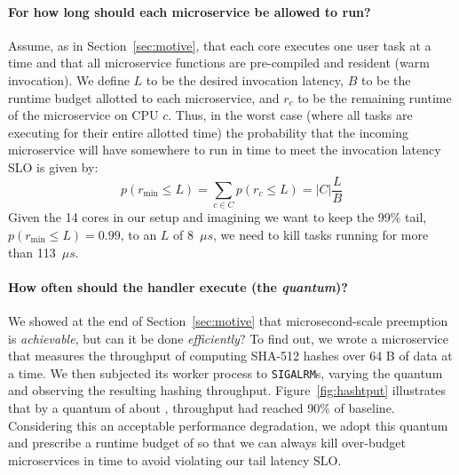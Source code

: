 \paragraph{For how long should each microservice be allowed to run?}
Assume, as in Section~\ref{sec:motive}, that each core executes one user task at a
time and that all microservice
functions are pre-compiled and resident (warm invocation).
We define $L$ to be the desired invocation latency, $B$ to be the
runtime budget allotted to each microservice, and $r_c$ to be the remaining runtime
of the microservice on CPU $c$.  Thus, in the worst case (where all tasks are
executing for their entire allotted time) the probability that the incoming
microservice will have somewhere to run in time to meet the invocation
latency SLO is given by:
\begin{equation}
p(r_\textrm{min} \le L) = \sum\limits_{c \in C} p(r_c \le L) = \big| C \big| \frac{L}{B}
\end{equation}
Given the 14 cores in our setup and imagining we want to keep the 99\% tail,
$p(r_\textrm{min} \le L) = 0.99$, to an $L$ of 8~$\mu{}s$, we need to kill tasks
running for more than 113~$\mu{}s$.

\paragraph{How often should the handler execute (the \emph{quantum})?}
We showed at the end of Section~\ref{sec:motive} that microsecond-scale preemption is
\textit{achievable}, but can it be done \textit{efficiently}?  To find out, we wrote
a microservice that measures the throughput of computing SHA-512 hashes over 64 B of
data at a time.  We then subjected its worker process to \texttt{SIGALRM}s, varying
the quantum and observing the resulting hashing throughput.
Figure~\ref{fig:hashtput} illustrates that by a quantum of about ,
throughput had reached 90\% of baseline.  Considering this an acceptable performance
degradation, we adopt this quantum and prescribe a runtime budget of  so
that we can always kill over-budget microservices in time to avoid violating our tail
latency SLO.

